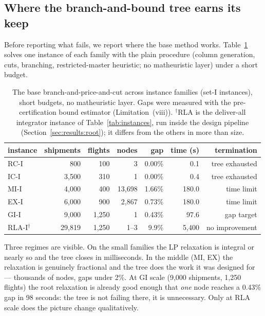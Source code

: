 \documentclass[11pt]{article}
\begin{document}
\subsection{Where the branch-and-bound tree earns its keep}
\label{sec:results:tree}

Before reporting what fails, we report where the base method works.
Table~\ref{tab:tree} solves one instance of each family with the plain
procedure (column generation, cuts, branching, restricted-master heuristic;
no matheuristic layer) under a short budget.

\begin{table}[t]
\centering\small
\begin{tabular}{lrrrrrr}
\toprule
instance & shipments & flights & nodes & gap & time (s) & termination \\
\midrule
RC-I  &    800 &   100 &      3 & 0.00\% &   0.1 & tree exhausted \\
IC-I  &  3{,}500 &   310 &      1 & 0.00\% &   0.4 & tree exhausted \\
MI-I  &  4{,}000 &   400 & 13{,}698 & 1.66\% & 180.0 & time limit \\
EX-I  &  6{,}000 &   900 &  2{,}867 & 0.73\% & 180.0 & time limit \\
GI-I  &  9{,}000 & 1{,}250 &      1 & 0.43\% &  97.6 & gap target \\
\midrule
RLA-I$^{\dagger}$ & 29{,}819 & 1{,}250 & 1--3 & 9.9\% & 5{,}400 & no improvement \\
\bottomrule
\end{tabular}
\caption{The base branch-and-price-and-cut across instance families (set-I
instances), short budgets, no matheuristic layer. Gaps were measured with
the pre-certification bound estimator (Limitation~(viii)).
$^{\dagger}$RLA is the deliver-all
integrator instance of Table~\ref{tab:instances}, run inside the design
pipeline (Section~\ref{sec:results:root}); it differs from the others in
more than size.}
\label{tab:tree}
\end{table}

Three regimes are visible. On the small families the LP relaxation is
integral or nearly so and the tree closes in milliseconds. In the middle
(MI, EX) the relaxation is genuinely fractional and the tree does the work
it was designed for --- thousands of nodes, gaps under 2\%. At GI scale
(9{,}000 shipments, 1{,}250 flights) the root relaxation is already good
enough that \emph{one} node reaches a 0.43\% gap in 98 seconds: the tree is
not failing there, it is unnecessary. Only at RLA scale does the picture
change qualitatively.
\end{document}
